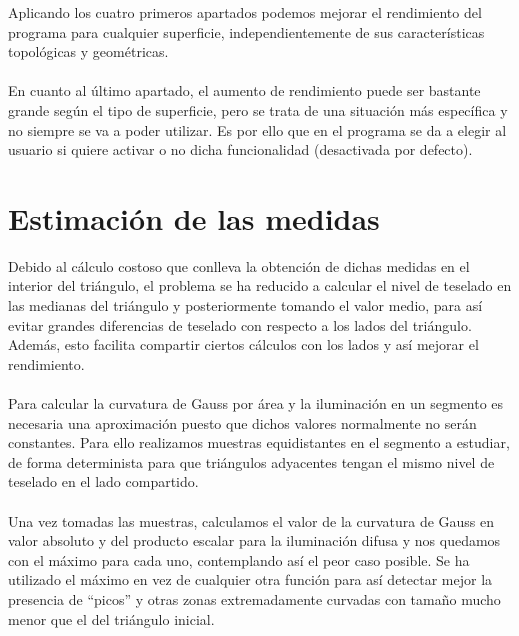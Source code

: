 	Aplicando los cuatro primeros apartados podemos mejorar el rendimiento del programa para cualquier superficie, independientemente de sus características topológicas y geométricas.\\
	\\En cuanto al último apartado, el aumento de rendimiento puede ser bastante grande según el tipo de superficie, pero se trata de una situación más específica y no siempre se va a poder utilizar. Es por ello que en el programa se da a elegir al usuario si quiere activar o no dicha funcionalidad (desactivada por defecto).
	
	
\section{Estimación de las medidas}
	Debido al cálculo costoso que conlleva la obtención de dichas medidas en el interior del triángulo, el problema se ha reducido a calcular el nivel de teselado en las medianas del triángulo y posteriormente tomando el valor medio, para así evitar grandes diferencias de teselado con respecto a los lados del triángulo. Además, esto facilita compartir ciertos cálculos con los lados y así mejorar el rendimiento.\\
	\\Para calcular la curvatura de Gauss por área y la iluminación en un segmento es necesaria una aproximación puesto que dichos valores normalmente no serán constantes. Para ello realizamos muestras equidistantes en el segmento a estudiar, de forma determinista para que triángulos adyacentes tengan el mismo nivel de teselado en el lado compartido.\\
	\\Una vez tomadas las muestras, calculamos el valor de la curvatura de Gauss en valor absoluto y del producto escalar para la iluminación difusa y nos quedamos con el máximo para cada uno, contemplando así el peor caso posible. Se ha utilizado el máximo en vez de cualquier otra función para así detectar mejor la presencia de ``picos'' y otras zonas extremadamente curvadas con tamaño mucho menor que el del triángulo inicial.

\endinput

